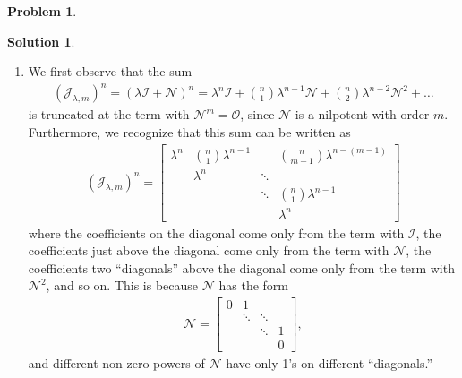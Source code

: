\documentclass{book}
\theoremstyle{definition}
\newtheorem*{prob*}{Problem}
\newtheorem*{sln*}{Solution}
\newcommand{\N}{\mathcal{N}}
\newcommand{\jor}{\mathcal{J}}
\begin{document}
\begin{prob*}
\begin{sln*}
\begin{enumerate}
			
			\item  We first observe that the sum
			\begin{align*}
			\left(\jor_{\lambda,m}\right)^n = \left(\lambda\mathcal{I} + \mathcal{N}\right)^n = 
			\lambda^n \mathcal{I} + {n\choose 1}\lambda^{n-1}\mathcal{N} + {n\choose 2}\lambda^{n-2}\mathcal{N}^2 + \dots
			\end{align*}
			is truncated at the term  with $\N^m = \mathcal{O}$, since $\N$ is a nilpotent with order $m$. Furthermore, we recognize that this sum can be written as
			\begin{align*}
			\left(\jor_{\lambda,m}\right)^n = \begin{bmatrix}
			\lambda^n & {n\choose 1}\lambda^{n-1} &  & {n\choose m-1}\lambda^{n-(m-1)}\\
					  &	\lambda^n		& 		\ddots	&	 \\
					  &					&	\ddots			& 	{n\choose 1}\lambda^{n-1}	\\
					  &					&				&	\lambda^n
			\end{bmatrix}
			\end{align*}
			where the coefficients on the diagonal come only from the term with $\mathcal{I}$, the coefficients just above the diagonal come only from the term with $\N$, the coefficients two ``diagonals'' above the diagonal come only from the term with $\N^2$, and so on. This is because $\N$ has the form
			\begin{align*}
			\N = \begin{bmatrix}
			0& 1 & & \\
			&\ddots & \ddots&\\
			& & \ddots &1 \\
			& & & 0
			\end{bmatrix},
			\end{align*}
			and different non-zero powers of $\N$ have only 1's on different ``diagonals.''\\
			

\end{enumerate}
\end{sln*}
\end{prob*}
\end{document}
